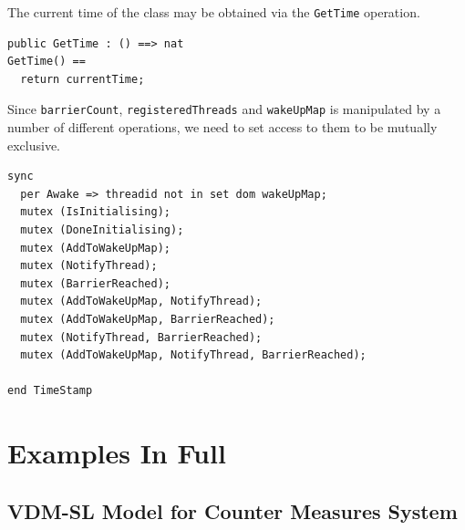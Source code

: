 \documentclass{overturerepchap}
\begin{document}
The current time of the class may be obtained via the \texttt{GetTime}
operation.

\begin{lstlisting}
public GetTime : () ==> nat
GetTime() ==
  return currentTime;
\end{lstlisting}

Since \texttt{barrierCount}, \texttt{registeredThreads} and 
\texttt{wakeUpMap} is manipulated by a number of different
operations, we need to set access to them to be mutually exclusive.

\begin{lstlisting}
sync
  per Awake => threadid not in set dom wakeUpMap;
  mutex (IsInitialising);
  mutex (DoneInitialising); 
  mutex (AddToWakeUpMap);
  mutex (NotifyThread);
  mutex (BarrierReached);  
  mutex (AddToWakeUpMap, NotifyThread);
  mutex (AddToWakeUpMap, BarrierReached);
  mutex (NotifyThread, BarrierReached);  
  mutex (AddToWakeUpMap, NotifyThread, BarrierReached);

end TimeStamp
\end{lstlisting}
 
\chapter{Examples In Full}\label{app:listing}

\section{VDM-SL Model for Counter Measures System}\label{app:VDMSLmodel}
\end{document}
